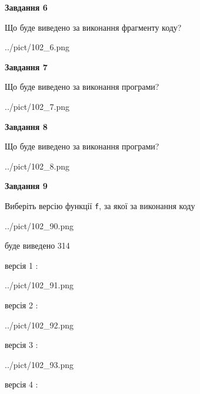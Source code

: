 \documentclass[12pt, ukrainian]{article}
\def\code#1{\Verb!#1!}
\begin{document}
{\begin {large}
{\begin {center}\textbf{Завдання 6}\end {center}}

Що буде виведено за виконання фрагменту коду?\par
\begin{center}
	{../pict/102_6.png}
\end{center}
\newpage

{\begin {center}\textbf{Завдання 7}\end {center}}

Що буде виведено за виконання програми?\par
\begin{center}
	{../pict/102_7.png}
\end{center}
\newpage

{\begin {center}\textbf{Завдання 8}\end {center}}

Що буде виведено за виконання програми?\par
\begin{center}
	{../pict/102_8.png}
\end{center}
\newpage

{\begin {center}\textbf{Завдання 9}\end {center}}

Виберіть версію функції \code{f}, за якої за виконання коду
\begin{center}
	{../pict/102_90.png}
\end{center}
буде виведено 314

\vspace{5mm}
версія 1 :

\begin{center}
	{../pict/102_91.png}
\end{center}
версія 2 :

\begin{center}
	{../pict/102_92.png}
\end{center}
версія 3 :

\begin{center}
	{../pict/102_93.png}
\end{center}
версія 4 :


\end{large}}
\end{document}
